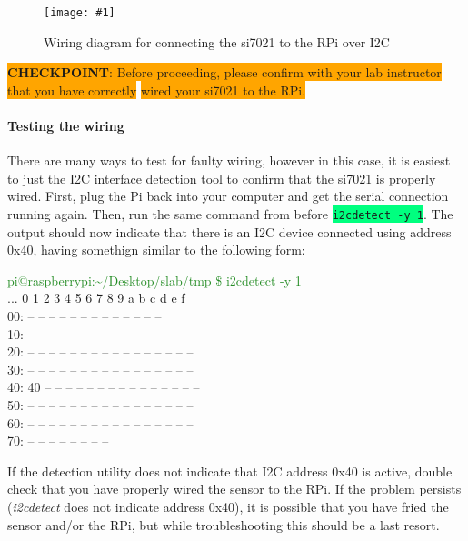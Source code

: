 \documentclass{article}
\newcommand*{\myfont}{\fontfamily{pcr}\selectfont}
\newcommand{\codei}[1]{\colorbox{SpringGreen}{\texttt{#1}}} %
\newcommand{\outputb}[2]{
  \begin{tcolorbox}[width=\textwidth,colback={light-gray},title={#1},colbacktitle=gray,coltitle=light-gray]
    \myfont
    #2
  \end{tcolorbox}
} %
\newcommand{\imagefigb}[2]{
    \begin{figure}[H]
        \centering
        \texttt{[image: \#1]}
        \caption{#2}
    \end{figure}
}
\newcommand{\checkpoint}[2]{
    \newline \newline
    \noindent
    \colorbox{Orange}{\textbf{CHECKPOINT}: #1} \newline \colorbox{Orange}{#2}
    \newline \newline
}
\begin{document}
    \imagefigb{si7021-wiring-diagram.png}{Wiring diagram for connecting the si7021 to the RPi over I2C}
    \checkpoint{Before proceeding, please confirm with your lab instructor that you have correctly}{wired your si7021 to the RPi.}

  \paragraph{Testing the wiring}
  There are many ways to test for faulty wiring, however in this case, it is easiest to just the I2C interface detection tool to confirm that the si7021 is properly wired. First, plug the Pi back into your computer and get the serial connection running again. Then, run the same command from before \codei{i2cdetect -y 1}. The output should now indicate that there is an I2C device connected using address 0x40, having somethign similar to the following form:
  \outputb{I2C detection output (si7021 wired)}
  {
    \textcolor{ForestGreen}{pi@raspberrypi:\textasciitilde/Desktop/slab/tmp \$ i2cdetect -y 1} \\
    ...  0  1  2  3  4  5  6  7  8  9  a  b  c  d  e  f \\
    00:          -- -- -- -- -- -- -- -- -- -- -- -- -- \\
    10: -- -- -- -- -- -- -- -- -- -- -- -- -- -- -- -- \\
    20: -- -- -- -- -- -- -- -- -- -- -- -- -- -- -- -- \\
    30: -- -- -- -- -- -- -- -- -- -- -- -- -- -- -- -- \\
    40: 40 -- -- -- -- -- -- -- -- -- -- -- -- -- -- -- \\
    50: -- -- -- -- -- -- -- -- -- -- -- -- -- -- -- -- \\
    60: -- -- -- -- -- -- -- -- -- -- -- -- -- -- -- -- \\
    70: -- -- -- -- -- -- -- --
  }

  If the detection utility does not indicate that I2C address 0x40 is active, double check that you have properly wired the sensor to the RPi. If the problem persists (\textit{i2cdetect} does not indicate address 0x40), it is possible that you have fried the sensor and/or the RPi, but while troubleshooting this should be a last resort.
\end{document}
